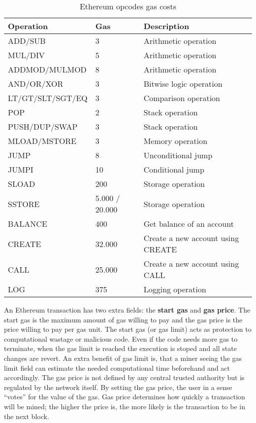 \begin{table}[!ht]
  \centering
  \begin{tabular}{|l|l|l|}
  \hline
   Operation & Gas  & Description \\ \hline
   ADD/SUB & 3 & Arithmetic operation \\ \hline
   MUL/DIV & 5 & Arithmetic operation \\ \hline
   ADDMOD/MULMOD & 8 & Arithmetic operation \\ \hline
   AND/OR/XOR & 3 & Bitwise logic operation \\ \hline
   LT/GT/SLT/SGT/EQ & 3 & Comparison operation \\ \hline
   POP & 2 & Stack operation \\ \hline
   PUSH/DUP/SWAP & 3 & Stack operation \\ \hline
   MLOAD/MSTORE & 3 & Memory operation \\ \hline
   JUMP & 8 & Unconditional jump \\ \hline
   JUMPI & 10 & Conditional jump \\ \hline
   SLOAD & 200 & Storage operation \\ \hline
   SSTORE & 5.000 / 20.000 & Storage operation \\ \hline
   BALANCE & 400 & Get balance of an account \\ \hline
   CREATE & 32.000 & Create a new account using CREATE \\ \hline
   CALL & 25.000 & Create a new account using CALL \\ \hline
   LOG & 375 & Logging operation \\ \hline
  \end{tabular}
  \caption{Ethereum opcodes gas costs}
  \label{table:opcode_gas_cost}
\end{table}

An Ethereum transaction has two extra fields: the \textbf{start gas} and \textbf{gas price}. The start gas is the maximum amount of gas willing to pay and the gas price is the price willing to pay per gas unit. The start gas (or gas limit) acts as protection to computational wastage or malicious code. Even if the code needs more gas to terminate, when the gas limit is reached the execution is stoped and all state changes are revert. An extra benefit of gas limit is, that a miner seeing the gas limit field can estimate the needed computational time beforehand and act accordingly. The gas price is not defined by any central trusted authority but is regulated by the network itself. By setting the gas price, the user in a sense ``votes'' for the value of the gas. Gas price determines how quickly a transaction will be mined; the higher the price is, the more likely is the transaction to be in the next block.

